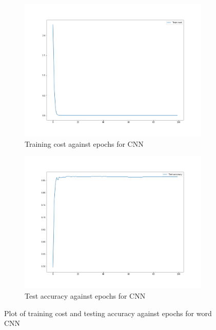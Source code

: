 \begin{figure}[H]
    \begin{subfigure}{0.5\textwidth}
        \centering
        \includegraphics[width=1\linewidth]{assets/plots2/q2_1.png}
        \caption{Training cost against epochs for CNN}
        \label{fig:1a_cost}
    \end{subfigure}
    \begin{subfigure}{0.5\textwidth}
        \centering
        \includegraphics[width=1\linewidth]{assets/plots2/q2_2.png}
        \caption{Test accuracy against epochs for CNN}
        \label{fig:1a_cost}
    \end{subfigure}
    \caption{Plot of training cost and testing accuracy against epochs for word CNN}
    \label{fig:1a}
\end{figure}


